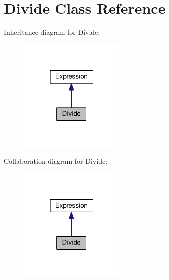 \hypertarget{classDivide}{}\section{Divide Class Reference}
\label{classDivide}


Inheritance diagram for Divide\+:\nopagebreak
\begin{figure}[H]
\begin{center}
\leavevmode
\includegraphics[width=145pt]{classDivide__inherit__graph}
\end{center}
\end{figure}


Collaboration diagram for Divide\+:\nopagebreak
\begin{figure}[H]
\begin{center}
\leavevmode
\includegraphics[width=145pt]{classDivide__coll__graph}
\end{center}
\end{figure}
